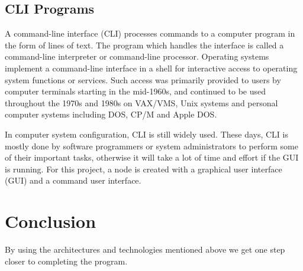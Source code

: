 \subsection{CLI Programs}

A command-line interface (CLI) processes commands to a computer program in the form of lines of text. The program which handles the interface is called a command-line interpreter or command-line processor. Operating systems implement a command-line interface in a shell for interactive access to operating system functions or services. Such access was primarily provided to users by computer terminals starting in the mid-1960s, and continued to be used throughout the 1970s and 1980s on VAX/VMS, Unix systems and personal computer systems including DOS, CP/M and Apple DOS.

In computer system configuration, CLI is still widely used. These days, CLI is mostly done by software programmers or system administrators to perform some of their important tasks, otherwise it will take a lot of time and effort if the GUI is running.
For this project, a node is created with a graphical user interface (GUI) and a command user interface.

\section{Conclusion}
By using the architectures and technologies mentioned above we get one step closer to completing the program.
